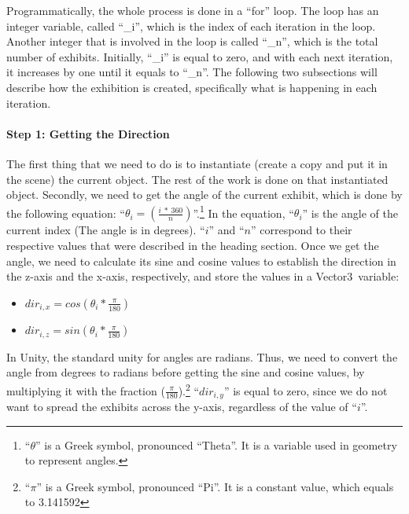 Programmatically, the whole process is done in a “for\normalfont” loop. The loop has an integer variable, called “\_i\normalfont”, which is the index of each iteration in the loop. Another integer that is involved in the loop is called “\_n\normalfont”, which is the total number of exhibits. Initially, “\_i\normalfont” is equal to zero, and with each next iteration, it increases by one until it equals to “\_n\normalfont”. The following two subsections will describe how the exhibition is created, specifically what is happening in each iteration.

\paragraph{Step 1: Getting the Direction}
The first thing that we need to do is to instantiate (create a copy and put it in the scene) the current object. The rest of the work is done on that instantiated object. Secondly, we need to get the angle of the current exhibit, which is done by the following equation: “$\theta_i = (\frac{i \ * \ 360}{n})$”.\footnote{“$\theta$” is a Greek symbol, pronounced “Theta”. It is a variable used in geometry to represent angles.}  In the equation, “$\theta_i$” is the angle of the current index (The angle is in degrees). “$i$” and “$n$” correspond to their respective values that were described in the heading section. Once we get the angle, we need to calculate its sine and cosine values to establish the direction in the z-axis and the x-axis, respectively, and store the values in a Vector3\normalfont \ variable:
\begin{itemize}
    \item {$dir_{i, x} = cos(\theta_i * \frac{\pi}{180})$}
    \item {$dir_{i, z} = sin(\theta_i * \frac{\pi}{180})$}
 \end{itemize}
In Unity, the standard unity for angles are radians. Thus, we need to convert the angle from degrees to radians before getting the sine and cosine values, by multiplying it with the fraction ($\frac{\pi}{180}$).\footnote{“$\pi$” is a Greek symbol, pronounced “Pi”. It is a constant value, which equals to 3.141592}  “$dir_{i, y}$” is equal to zero, since we do not want to spread the exhibits across the y-axis, regardless of the value of “$i$”.


